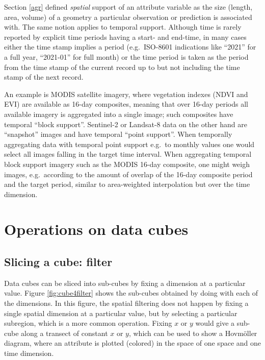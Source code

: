 \documentclass[]{book}
\begin{document}
Section \ref{agr} defined \emph{spatial} support of an attribute variable
as the size (length, area, volume) of a geometry a particular
observation or prediction is associated with. The same notion
applies to temporal support. Although time is rarely reported by
explicit time periods having a start- and end-time, in many cases
either the time stamp implies a period (e.g.~ISO-8601 indications
like ``2021'' for a full year, ``2021-01'' for full month) or the time
period is taken as the period from the time stamp of the current
record up to but not including the time stamp of the next record.

An example is MODIS satellite imagery, where vegetation indexes (NDVI
and EVI) are available as 16-day composites, meaning that over 16-day
periods all available imagery is aggregated into a single image; such
composites have temporal ``block support''. Sentinel-2 or Landsat-8
data on the other hand are ``snapshot'' images and have temporal
``point support''. When temporally aggregating data with temporal
point support e.g.~to monthly values one would select all images
falling in the target time interval. When aggregating temporal block
support imagery such as the MODIS 16-day composite, one might
weigh images, e.g.~according to the amount of overlap of the 16-day
composite period and the target period, similar to area-weighted
interpolation but over the time dimension.

\hypertarget{dcoperations}{%
\section{Operations on data cubes}\label{dcoperations}}

\hypertarget{slicing-a-cube-filter}{%
\subsection{Slicing a cube: filter}\label{slicing-a-cube-filter}}

Data cubes can be sliced into sub-cubes by fixing a dimension at a
particular value. Figure \ref{fig:cube4filter} shows the sub-cubes
obtained by doing with each of the dimensions. In this figure,
the spatial filtering does not happen by fixing a single spatial
dimension at a particular value, but by selecting a particular
subregion, which is a more common operation. Fixing \(x\) or \(y\) would
give a sub-cube along a transect of constant \(x\) or \(y\), which can
be used to show a Hovmöller diagram, where an attribute is plotted
(colored) in the space of one space and one time dimension.
\end{document}
